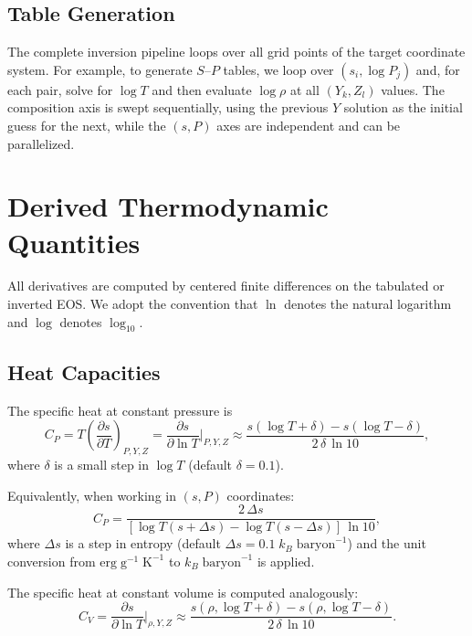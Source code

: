 \documentclass[twocolumn]{aastex701}
\begin{document}
\subsection{Table Generation}

The complete inversion pipeline loops over all grid points of the target coordinate system.
For example, to generate $S$--$P$ tables, we loop over $(s_i, \log P_j)$ and, for each pair, solve for $\log T$ and then evaluate $\log\rho$ at all $(Y_k, Z_l)$ values.
The composition axis is swept sequentially, using the previous $Y$ solution as the initial guess for the next, while the $(s, P)$ axes are independent and can be parallelized.

\section{Derived Thermodynamic Quantities}\label{sec:derivatives}

All derivatives are computed by centered finite differences on the tabulated or inverted EOS.
We adopt the convention that $\ln$ denotes the natural logarithm and $\log$ denotes $\log_{10}$.

\subsection{Heat Capacities}

The specific heat at constant pressure is
\begin{equation}\label{eq:cp}
    C_P = T\left(\frac{\partial s}{\partial T}\right)_{\!P,Y,Z} = \frac{\partial s}{\partial \ln T}\bigg|_{P,Y,Z} \approx \frac{s(\log T + \delta) - s(\log T - \delta)}{2\,\delta\,\ln 10},
\end{equation}
where $\delta$ is a small step in $\log T$ (default $\delta = 0.1$).

Equivalently, when working in $(s,P)$ coordinates:
\begin{equation}
    C_P = \frac{2\,\Delta s}{\left[\log T(s+\Delta s) - \log T(s-\Delta s)\right]\,\ln 10},
\end{equation}
where $\Delta s$ is a step in entropy (default $\Delta s = 0.1\;k_B\;\mathrm{baryon}^{-1}$) and the unit conversion from $\mathrm{erg\;g^{-1}\;K^{-1}}$ to $k_B\;\mathrm{baryon}^{-1}$ is applied.

The specific heat at constant volume is computed analogously:
\begin{equation}\label{eq:cv}
    C_V = \frac{\partial s}{\partial \ln T}\bigg|_{\rho,Y,Z} \approx \frac{s(\rho, \log T + \delta) - s(\rho, \log T - \delta)}{2\,\delta\,\ln 10}.
\end{equation}
\end{document}
